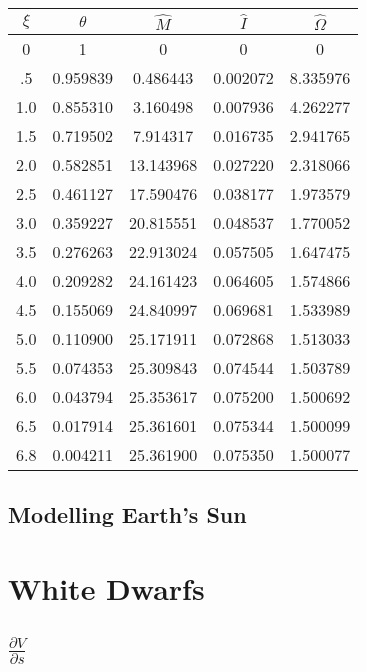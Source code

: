 \documentclass[11pt]{article} %
\newcommand{\pder}[2][]{\frac{\partial#1}{\partial#2}}
\begin{document}
\begin{tabular}{| c | c c c c |}
\hline
$\xi$ & $\theta$ & $\hat{M}$ &  $\hat{I}$  & $\hat{\Omega}$ \\
\hline
0 & 1 & 0 & 0 & 0 \\
.5 & 0.959839 & 0.486443 & 0.002072 &8.335976\\
1.0 & 0.855310 & 3.160498 &0.007936 & 4.262277\\
1.5 & 0.719502 & 7.914317 & 0.016735 & 2.941765\\
2.0 &0.582851 &13.143968 &0.027220 & 2.318066\\
2.5 & 0.461127 & 17.590476 &0.038177 & 1.973579\\
3.0 & 0.359227 &20.815551 & 0.048537 & 1.770052\\
3.5 & 0.276263 &22.913024 & 0.057505 & 1.647475\\
4.0 &0.209282 &24.161423 &0.064605 & 1.574866\\
4.5 &0.155069 &24.840997 &0.069681 & 1.533989\\
5.0 & 0.110900 & 25.171911  &0.072868&1.513033\\
5.5 & 0.074353 & 25.309843  &0.074544 &1.503789\\
6.0 &0.043794 &25.353617 &0.075200 & 1.500692\\
6.5 & 0.017914 &25.361601 &0.075344 & 1.500099\\
6.8 &0.004211 &25.361900 &0.075350 & 1.500077\\
\hline
\end{tabular}
\subsection*{Modelling Earth's Sun}

\section{White Dwarfs}
\subsection*{$\pder[V]{s}$}
\end{document}
